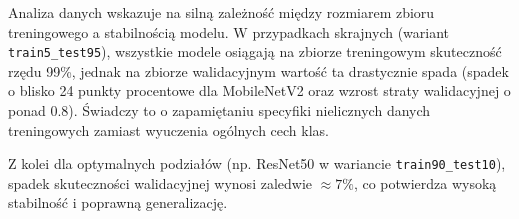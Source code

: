 \documentclass[12pt,a4paper]{article}
\begin{document}
\begin{table}[H]
    \centering
    \caption{Zestawienie wyników na zbiorze walidacyjnym oraz wskaźników przeuczenia modeli}
    \label{tab:validation_overfitting_report}
\end{table}

Analiza danych wskazuje na silną zależność między rozmiarem zbioru treningowego a stabilnością modelu. W przypadkach skrajnych (wariant \texttt{train5\_test95}), wszystkie modele osiągają na zbiorze treningowym skuteczność rzędu 99\%, jednak na zbiorze walidacyjnym wartość ta drastycznie spada (spadek o blisko 24 punkty procentowe dla MobileNetV2 oraz wzrost straty walidacyjnej o ponad $0.8$). Świadczy to o zapamiętaniu specyfiki nielicznych danych treningowych zamiast wyuczenia ogólnych cech klas. 

Z kolei dla optymalnych podziałów (np. ResNet50 w wariancie \texttt{train90\_test10}), spadek skuteczności walidacyjnej wynosi zaledwie $\approx 7\%$, co potwierdza wysoką stabilność i poprawną generalizację.
\end{document}

